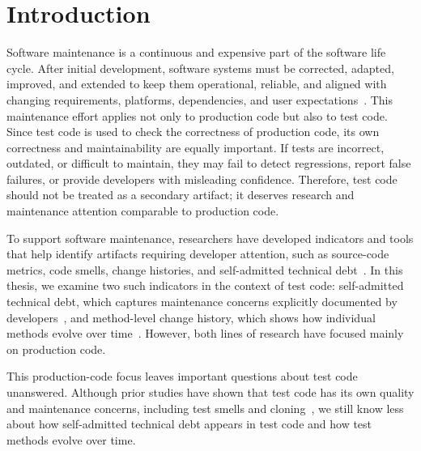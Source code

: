 \chapter{Introduction}
\label{ch:intro}

Software maintenance is a continuous and expensive part of the software life cycle. After initial development, software systems must be corrected, adapted, improved, and extended to keep them operational, reliable, and aligned with changing requirements, platforms, dependencies, and user expectations~\cite{kafura_use_1987, borstler_role_2016, sokolowski2022change, zhang2024developers}. This maintenance effort applies not only to production code but also to test code. Since test code is used to check the correctness of production code, its own correctness and maintainability are equally important. If tests are incorrect, outdated, or difficult to maintain, they may fail to detect regressions, report false failures, or provide developers with misleading confidence. Therefore, test code should not be treated as a secondary artifact; it deserves research and maintenance attention comparable to production code.

To support software maintenance, researchers have developed indicators and tools that help identify artifacts requiring developer attention, such as source-code metrics, code smells, change histories, and self-admitted technical debt~\cite{romano_using_2011, khomh_exploratory_2009, pascarella_performance_2020, chowdhury_method-level_2024, chowdhury_good_2025, potdar_exploratory_2014, maldonado_detecting_2015}. In this thesis, we examine two such indicators in the context of test code: self-admitted technical debt, which captures maintenance concerns explicitly documented by developers~\cite{potdar_exploratory_2014, maldonado_detecting_2015}, and method-level change history, which shows how individual methods evolve over time~\cite{higo_tracking_2020, grund_codeshovel_2021, jodavi_accurate_2022}. However, both lines of research have focused mainly on production code.

This production-code focus leaves important questions about test code unanswered. Although prior studies have shown that test code has its own quality and maintenance concerns, including test smells and cloning~\cite{bavota_are_2015, tufano_empirical_2016, counsell_comparing_2016, van_bladel_comparative_2023, spadini_relation_2018}, we still know less about how self-admitted technical debt appears in test code and how test methods evolve over time.

